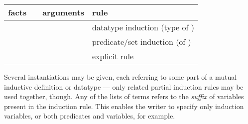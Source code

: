 \begin{isabellebody}
\begin{isamarkuptext}
\begin{description}
  \medskip
  \begin{tabular}{llll}
    facts           &                  & arguments            & rule \\\hline
                    & \hyperlink{method.induct}{\mbox{\isa{induct}}} & \isa{{\isaliteral{22}{\isachardoublequote}}P\ x{\isaliteral{22}{\isachardoublequote}}}        & datatype induction (type of \isa{x}) \\
    \isa{{\isaliteral{22}{\isachardoublequote}}{\isaliteral{5C3C7475726E7374696C653E}{\isasymturnstile}}\ A\ x{\isaliteral{22}{\isachardoublequote}}} & \hyperlink{method.induct}{\mbox{\isa{induct}}} & \isa{{\isaliteral{22}{\isachardoublequote}}{\isaliteral{5C3C646F74733E}{\isasymdots}}{\isaliteral{22}{\isachardoublequote}}}          & predicate/set induction (of \isa{A}) \\
    \isa{{\isaliteral{22}{\isachardoublequote}}{\isaliteral{5C3C646F74733E}{\isasymdots}}{\isaliteral{22}{\isachardoublequote}}}     & \hyperlink{method.induct}{\mbox{\isa{induct}}} & \isa{{\isaliteral{22}{\isachardoublequote}}{\isaliteral{5C3C646F74733E}{\isasymdots}}\ rule{\isaliteral{3A}{\isacharcolon}}\ R{\isaliteral{22}{\isachardoublequote}}} & explicit rule \isa{R} \\
  \end{tabular}
  \medskip
  
  Several instantiations may be given, each referring to some part of
  a mutual inductive definition or datatype --- only related partial
  induction rules may be used together, though.  Any of the lists of
  terms  refers to the \emph{suffix} of variables
  present in the induction rule.  This enables the writer to specify
  only induction variables, or both predicates and variables, for
  example.


\end{description}
\end{isamarkuptext}
\end{isabellebody}
